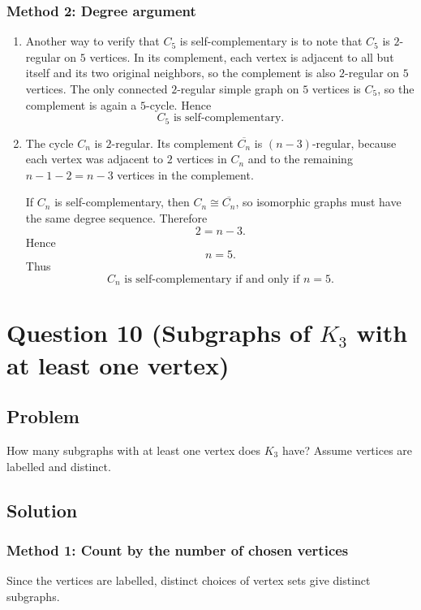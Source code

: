 \documentclass[12pt]{article}
\newcommand{\comp}[1]{\overline{#1}}
\begin{document}
\subsubsection{Method 2: Degree argument}
\begin{enumerate}[label=(\alph*)]
\item Another way to verify that \(C_5\) is self-complementary is to note that \(C_5\) is \(2\)-regular on \(5\) vertices. In its complement, each vertex is adjacent to all but itself and its two original neighbors, so the complement is also \(2\)-regular on \(5\) vertices. The only connected \(2\)-regular simple graph on \(5\) vertices is \(C_5\), so the complement is again a \(5\)-cycle. Hence
\[
\boxed{C_5 \text{ is self-complementary.}}
\]

\item The cycle \(C_n\) is \(2\)-regular. Its complement \(\comp{C_n}\) is \((n-3)\)-regular, because each vertex was adjacent to \(2\) vertices in \(C_n\) and to the remaining \(n-1-2=n-3\) vertices in the complement.

If \(C_n\) is self-complementary, then \(C_n\cong \comp{C_n}\), so isomorphic graphs must have the same degree sequence. Therefore
\[
2=n-3.
\]
Hence
\[
n=5.
\]
Thus
\[
\boxed{C_n \text{ is self-complementary if and only if } n=5.}
\]
\end{enumerate}

\newpage

\section{Question 10 (Subgraphs of \(K_3\) with at least one vertex)}

\subsection{Problem}
How many subgraphs with at least one vertex does \(K_3\) have? Assume vertices are labelled and distinct.

\subsection{Solution}

\subsubsection{Method 1: Count by the number of chosen vertices}
Since the vertices are labelled, distinct choices of vertex sets give distinct subgraphs.
\end{document}
